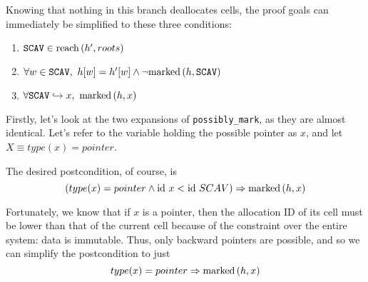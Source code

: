 \begin{lemma}
  Knowing that nothing in this branch deallocates cells, the proof
  goals can immediately be simplified to these three conditions:
  \begin{enumerate}
    \item $\mathtt{SCAV} \in \reach{h'}{roots}$
    \item $\forall w \in \mathtt{SCAV},\ h[w] = h'[w] \land
      \lnot\marked{h}{\mathtt{SCAV}}$
    \item $\forall \mathtt{SCAV} \pointsto x,\ \marked{h}{x}$
  \end{enumerate}
  Firstly, let's look at the two expansions of
  \texttt{possibly\_mark}, as they are almost identical. Let's refer
  to the variable holding the possible pointer as $x$, and let $X
  \equiv type(x) = pointer$.
  \begin{prooftree}

  \end{prooftree}
  The desired postcondition, of course, is \[(type(x) = pointer \land
  \id~x < \id~SCAV) \implies \marked{h}{x}\]

  Fortunately, we know that if $x$ is a pointer, then the allocation
  ID of its cell must be lower than that of the current cell because
  of the constraint over the entire system: data is immutable. Thus,
  only backward pointers are possible, and so we can simplify the
  postcondition to just \[type(x) = pointer \implies \marked{h}{x}\]


\end{lemma}
